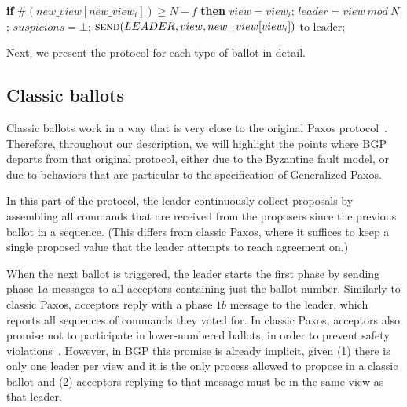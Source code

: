 \begin{algorithm}
\begin{multicols}{2}
\begin{algorithmic}[1]
			\State\hspace{\algorithmicindent} \textbf{if} $\#(new\_view[new\_view_i]) \geq N-f$ \textbf{then}
			\State\hspace{\algorithmicindent}\hspace{\algorithmicindent} $view = view_i$;
			\State\hspace{\algorithmicindent}\hspace{\algorithmicindent} $leader = view\ mod\ N$;
			\State\hspace{\algorithmicindent}\hspace{\algorithmicindent} $suspicions = \bot$;
			\State\hspace{\algorithmicindent}\hspace{\algorithmicindent} $\Call{send}{LEADER, view, new\_view[view_i]}$ to leader;
		\end{algorithmic}
	\end{multicols}
	\vspace*{-.4cm}
\end{algorithm}

Next, we present the protocol for each type of ballot in detail.

\subsection{Classic ballots} 

Classic ballots work in a way that is very close to the original Paxos protocol~\cite{Lam98}. Therefore, throughout our description, we will highlight the points where BGP departs from that original protocol, either due to the Byzantine fault model, or due to behaviors that are particular to the specification of Generalized Paxos.

In this part of the protocol, the leader continuously collect proposals by assembling all commands that are received from the proposers since the previous ballot in a sequence. (This differs from classic Paxos, where it suffices to keep a single proposed value that the leader attempts to reach agreement on.)

When the next ballot is triggered, the leader starts the first phase by sending phase $1a$ messages to all acceptors containing just the ballot number. Similarly to classic Paxos, acceptors reply with a phase $1b$ message to the leader, which reports all sequences of commands they voted for. In classic Paxos, acceptors also promise not to participate in lower-numbered ballots, in order to prevent safety violations~\cite{Lam98}.  However, in BGP this promise is already implicit, given (1) there is only one leader per view and it is the only process allowed to propose in a classic ballot and (2) acceptors replying to that message must be in the same view as that leader.

